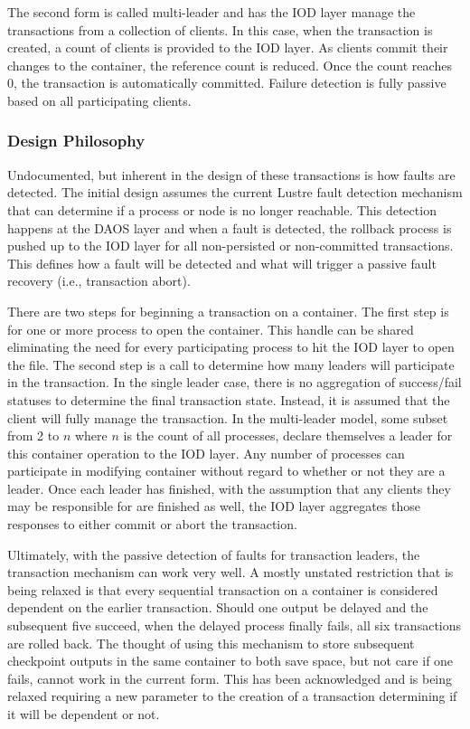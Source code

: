 \documentclass[conference]{IEEEtran}
\begin{document}
The second form is called multi-leader and has the IOD layer manage the
transactions from a collection of clients. In this case, when the transaction
is created, a count of clients is provided to the IOD layer. As clients commit
their changes to the container, the reference count is reduced. Once the count
reaches 0, the transaction is automatically committed. Failure detection is
fully passive based on all participating clients.

\subsubsection{Design Philosophy}
Undocumented, but inherent in the design of these transactions is how faults
are detected. The initial design assumes the current Lustre fault detection
mechanism that can determine if a process or node is no longer reachable. This
detection happens at the DAOS layer and when a fault is detected, the rollback
process is pushed up to the IOD layer for all non-persisted or non-committed
transactions. This defines how a fault will be detected and what will trigger a
passive fault recovery (i.e., transaction abort).

There are two steps for beginning a transaction on a container. The first step
is for one or more process to open the container. This handle can be shared
eliminating the need for every participating process to hit the IOD layer to
open the file. The second step is a call to determine how many leaders will
participate in the transaction. In the single leader case, there is no
aggregation of success/fail statuses to determine the final transaction state.
Instead, it is assumed that the client will fully manage the transaction. In
the multi-leader model, some subset from 2 to $n$ where $n$ is the count of all
processes, declare themselves a leader for this container operation to the IOD
layer. Any number of processes can participate in modifying container without
regard to whether or not they are a leader. Once each leader has finished, with
the assumption that any clients they may be responsible for are finished as
well, the IOD layer aggregates those responses to either commit or abort the
transaction.

Ultimately, with the passive detection of faults for transaction leaders, the
transaction mechanism can work very well. A mostly unstated restriction that is
being relaxed is that every sequential transaction on a container is considered
dependent on the earlier transaction. Should one output be delayed and the
subsequent five succeed, when the delayed process finally fails, all six
transactions are rolled back. The thought of using this mechanism to store
subsequent checkpoint outputs in the same container to both save space, but not
care if one fails, cannot work in the current form. This has been acknowledged
and is being relaxed requiring a new parameter to the creation of a transaction
determining if it will be dependent or not.
\end{document}
